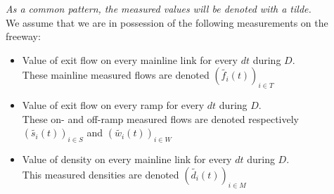 \emph{As a common pattern, the measured values will be denoted with a tilde.}\\
We assume that we are in possession of the following measurements on the freeway:
\begin{itemize}
	\item Value of exit flow on every mainline link for every $dt$ during $D$.\\
	These mainline measured flows are denoted $(\widetilde{f_{i}}(t))_{i\in{T}}$
	\item Value of exit flow on every ramp for every $dt$ during $D$.\\
	These on- and off-ramp measured flows are denoted respectively $(\widetilde{s_{i}}(t))_{i\in{S}}$ and $(\widetilde{w_{i}}(t))_{i\in{W}}$
	\item Value of density on every mainline link for every $dt$ during $D$.\\
	This measured densities are denoted $(\widetilde{d_{i}}(t))_{i\in{M}}$
\end{itemize}

